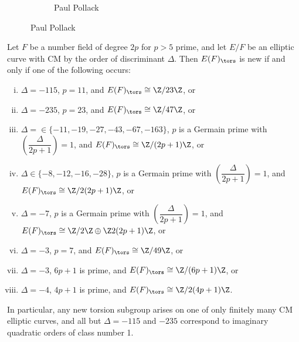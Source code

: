 \begin{frame}[plain]
\begin{figure}[h]
\begin{subfigure}{0.3\textwidth}
	\caption{Paul Pollack}
	\end{subfigure}
	\end{figure}
\end{frame}



\begin{frame}[plain]
\tiny
\begin{thm}
Let $F$ be a number field of degree $2p$ for $p > 5$ prime, and let $E/F$ be an elliptic curve with CM by the order of discriminant $\Delta$. Then $E(F)_\tors$ is new if and only if one of the following occurs:
	\begin{enumerate}[(i)]
	\item $\Delta= -115$, $p= 11$, and $E(F)_\tors \cong \Z/23\Z$, or 
	\item $\Delta= -235$, $p= 23$, and $E(F)_\tors \cong \Z/47\Z$, or
	\item $\Delta= \in \{ -11, -19, -27, -43, -67, -163 \}$, $p$ is a Germain prime with $\left( \dfrac{\Delta}{2p + 1} \right)= 1$, and $E(F)_\tors \cong \Z/(2p + 1)\Z$, or
	\item $\Delta \in \{ -8, -12, -16, -28 \}$, $p$ is a Germain prime with $\left( \dfrac{\Delta}{2p + 1} \right)= 1$, and $E(F)_\tors \cong \Z/2(2p + 1)\Z$, or 
	\item $\Delta= -7$, $p$ is a Germain prime with $\left( \dfrac{\Delta}{2p + 1} \right)= 1$, and $E(F)_\tors \cong \Z/2\Z \oplus \Z 2(2p + 1)\Z$, or
	\item $\Delta= -3$, $p= 7$, and $E(F)_\tors \cong \Z/49\Z$, or 
	\item $\Delta= -3$, $6p + 1$ is prime, and $E(F)_\tors \cong \Z/(6p + 1)\Z$, or
	\item $\Delta= -4$, $4p + 1$ is prime, and $E(F)_\tors \cong \Z/2(4p + 1)\Z$. 
	\end{enumerate}
In particular, any new torsion subgroup arises on one of only finitely many CM elliptic curves, and all but $\Delta= -115$ and $-235$ correspond to imaginary quadratic orders of class number 1. 
\end{thm} 


\end{frame}
